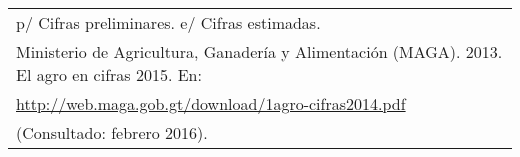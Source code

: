 {\begin{center}
\begin{tabular}{lccc}
			\multicolumn{4}{l}{\footnotesize p/ Cifras preliminares.  e/ Cifras estimadas.}\\	
			\multicolumn{4}{l}{\footnotesize	Ministerio de Agricultura, Ganadería y Alimentación (MAGA). 2013. El agro en cifras 2015. En:}\\
			\multicolumn{4}{l}{\footnotesize \url{http://web.maga.gob.gt/download/1agro-cifras2014.pdf}}\\
			\multicolumn{4}{l}{\footnotesize  (Consultado: febrero 2016).}
		\end{tabular}\addtocounter{Cuadro}{1}
	\end{center} }
	
